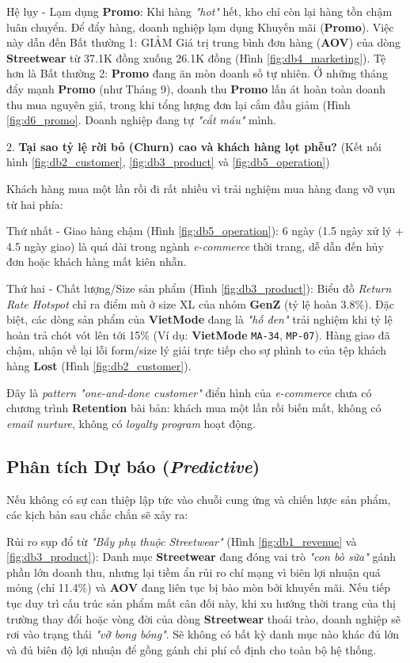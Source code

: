 \documentclass{article}
\begin{document}
Hệ lụy - Lạm dụng \textbf{Promo}: Khi hàng \textit{"hot"} hết, kho chỉ còn lại hàng tồn chậm luân chuyển. Để đẩy hàng, doanh nghiệp lạm dụng Khuyến mãi (\textbf{Promo}). Việc này dẫn đến Bất thường 1: GIẢM Giá trị trung bình đơn hàng (\textbf{AOV}) của dòng \textbf{Streetwear} từ 37.1K đồng xuống 26.1K đồng (Hình \ref{fig:db4_marketing}). Tệ hơn là Bất thường 2: \textbf{Promo} đang ăn mòn doanh số tự nhiên. Ở những tháng đẩy mạnh \textbf{Promo} (như Tháng 9), doanh thu \textbf{Promo} lấn át hoàn toàn doanh thu mua nguyên giá, trong khi tổng lượng đơn lại cắm đầu giảm (Hình \ref{fig:d6_promo}. Doanh nghiệp đang tự \textit{"cắt máu"} mình.

2. \textbf{Tại sao tỷ lệ rời bỏ (\textbf{Churn}) cao và khách hàng lọt phễu?} (Kết nối hình \ref{fig:db2_customer}, \ref{fig:db3_product} và \ref{fig:db5_operation}) 

Khách hàng mua một lần rồi đi rất nhiều vì trải nghiệm mua hàng đang vỡ vụn từ hai phía:

Thứ nhất - Giao hàng chậm (Hình \ref{fig:db5_operation}): 6 ngày (1.5 ngày xử lý + 4.5 ngày giao) là quá dài trong ngành \textit{e-commerce} thời trang, dễ dẫn đến hủy đơn hoặc khách hàng mất kiên nhẫn.

Thứ hai - Chất lượng/Size sản phẩm (Hình \ref{fig:db3_product}): Biểu đồ \textit{Return Rate Hotspot} chỉ ra điểm mù ở size XL của nhóm \textbf{GenZ} (tỷ lệ hoàn 3.8\%). Đặc biệt, các dòng sản phẩm của \textbf{VietMode} đang là \textit{"hố đen"} trải nghiệm khi tỷ lệ hoàn trả chót vót lên tới 15\% (Ví dụ: \textbf{VietMode} \texttt{MA-34}, \texttt{MP-07}). Hàng giao đã chậm, nhận về lại lỗi form/size lý giải trực tiếp cho sự phình to của tệp khách hàng \textbf{Lost} (Hình \ref{fig:db2_customer}).

Đây là \textit{pattern "one-and-done customer"} điển hình của \textit{e-commerce} chưa có chương trình \textbf{Retention} bài bản: khách mua một lần rồi biến mất, không có \textit{email nurture}, không có \textit{loyalty program} hoạt động.

\subsection{Phân tích Dự báo (\textit{Predictive})}

Nếu không có sự can thiệp lập tức vào chuỗi cung ứng và chiến lược sản phẩm, các kịch bản sau chắc chắn sẽ xảy ra:

Rủi ro sụp đổ từ \textit{"Bẫy phụ thuộc Streetwear"} (Hình \ref{fig:db1_revenue} và \ref{fig:db3_product}): Danh mục \textbf{Streetwear} đang đóng vai trò \textit{"con bò sữa"} gánh phần lớn doanh thu, nhưng lại tiềm ẩn rủi ro chí mạng vì biên lợi nhuận quá mỏng (chỉ 11.4\%) và \textbf{AOV} đang liên tục bị bào mòn bởi khuyến mãi. Nếu tiếp tục duy trì cấu trúc sản phẩm mất cân đối này, khi xu hướng thời trang của thị trường thay đổi hoặc vòng đời của dòng \textbf{Streetwear} thoái trào, doanh nghiệp sẽ rơi vào trạng thái \textit{"vỡ bong bóng"}. Sẽ không có bất kỳ danh mục nào khác đủ lớn và đủ biên độ lợi nhuận để gồng gánh chi phí cố định cho toàn bộ hệ thống.
\end{document}

